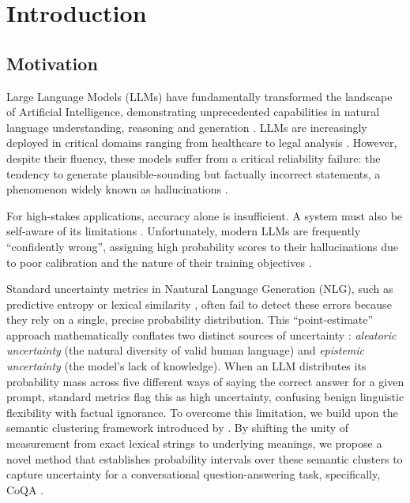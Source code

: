 %
\chapter{Introduction}
\label{sec:intro}

\section{Motivation}
\label{sec:intro:motivation}
Large Language Models (LLMs) have fundamentally transformed the  
landscape of Artificial Intelligence, demonstrating unprecedented
capabilities in natural language understanding, reasoning and 
generation 
\parencite{brown2020languagemodelsfewshotlearners, wei2023chainofthoughtpromptingelicitsreasoning}.
LLMs are increasingly deployed in critical domains ranging 
from healthcare \parencite{10.1001/jama.2024.21700} 
to legal analysis \parencite{10850911}. 
However, despite their fluency, 
these models suffer from a critical reliability failure:
the tendency to generate plausible-sounding but factually incorrect 
statements, a phenomenon widely known as hallucinations 
\parencite{Huang2023ASO}.

For high-stakes applications, accuracy alone is insufficient. A 
system must also be self-aware of its limitations 
\parencite{bommasani2022opportunitiesrisksfoundationmodels}. 
Unfortunately, modern LLMs 
are frequently ``confidently wrong'', assigning high probability scores 
to their hallucinations due to poor calibration 
\parencite{guo2017calibrationmodernneuralnetworks, 
desai2020calibrationpretrainedtransformers} 
and the nature of their training objectives \parencite{Ji_2023}.

Standard uncertainty metrics in Nautural Language Generation (NLG),
such as predictive entropy
\parencite{malinin2021uncertaintyestimationautoregressivestructured}
or lexical similarity 
\parencite{fomicheva2020unsupervisedqualityestimationneural}, 
often fail to detect these errors because they 
rely on a single, precise probability distribution. This 
``point-estimate'' approach mathematically conflates two distinct 
sources of uncertainty \parencite{H_llermeier_2021}: 
\textit{aleatoric uncertainty} 
(the natural diversity of valid human language) 
and \textit{epistemic uncertainty} (the model's lack of knowledge). 
When an LLM distributes its 
probability mass across five different ways of saying the correct
answer for a given prompt, standard metrics flag this as 
high uncertainty, confusing benign linguistic flexibility with 
factual ignorance. 
To overcome this limitation, we build upon the semantic clustering
framework introduced by 
\textcite{kuhn2023semanticuncertaintylinguisticinvariances}.
By shifting the unity of measurement from exact lexical strings
to underlying meanings, we propose a novel method that establishes
probability intervals over these semantic clusters
to capture uncertainty for a conversational question-answering task, 
specifically, CoQA 
\parencite{reddy2019coqaconversationalquestionanswering}.

